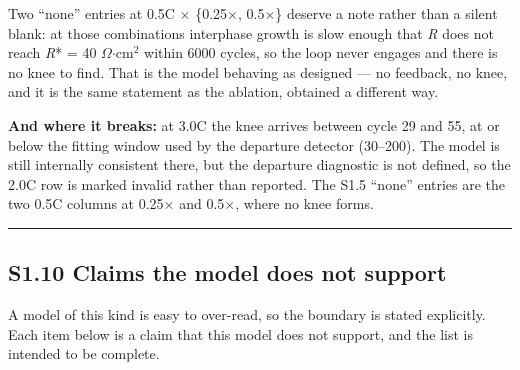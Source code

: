 \documentclass[11pt,a4paper]{article}
\begin{document}
Two \textquotedblleft{}none\textquotedblright{} entries at 0.5C \ensuremath{\times} \{0.25\ensuremath{\times}, 0.5\ensuremath{\times}\} deserve a note rather than a silent blank: at those combinations interphase growth is slow enough that \emph{R} does not reach \emph{R}* = 40 \ensuremath{\Omega}\ensuremath{\cdot}cm\ensuremath{^{2}} within 6000 cycles, so the loop never engages and there is no knee to find. That is the model behaving as designed --- no feedback, no knee, and it is the same statement as the ablation, obtained a different way.


\textbf{And where it breaks:} at 3.0C the knee arrives between cycle 29 and 55, at or below the fitting window used by the departure detector (30--200). The model is still internally consistent there, but the departure diagnostic is not defined, so the 2.0C row is marked invalid rather than reported. The S1.5 \textquotedblleft{}none\textquotedblright{} entries are the two 0.5C columns at 0.25\ensuremath{\times} and 0.5\ensuremath{\times}, where no knee forms.


\par\noindent\rule{\linewidth}{0.4pt}\par


\subsection*{S1.10 Claims the model does not support}


A model of this kind is easy to over-read, so the boundary is stated explicitly. Each item below is a claim that this model does not support, and the list is intended to be complete.
\end{document}
